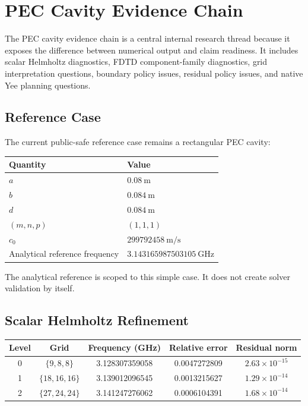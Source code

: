 \documentclass[11pt,a4paper]{article}
\begin{document}
\section{PEC Cavity Evidence Chain}
\label{sec:pec-cavity-evidence-chain}

The PEC cavity evidence chain is a central internal research thread because it exposes the difference between numerical output and claim readiness. It includes scalar Helmholtz diagnostics, FDTD component-family diagnostics, grid interpretation questions, boundary policy issues, residual policy issues, and native Yee planning questions.

\subsection{Reference Case}

The current public-safe reference case remains a rectangular PEC cavity:

\begin{center}
\begin{tabular}{ll}
\toprule
\textbf{Quantity} & \textbf{Value}\\
\midrule
\(a\) & \(0.08\ \mathrm{m}\)\\
\(b\) & \(0.084\ \mathrm{m}\)\\
\(d\) & \(0.084\ \mathrm{m}\)\\
\((m,n,p)\) & \((1,1,1)\)\\
\(c_0\) & \(299792458\ \mathrm{m/s}\)\\
Analytical reference frequency & \(3.143165987503105\ \mathrm{GHz}\)\\
\bottomrule
\end{tabular}
\end{center}

The analytical reference is scoped to this simple case. It does not create solver validation by itself.

\subsection{Scalar Helmholtz Refinement}

\begin{longtable}{ccccc}
\toprule
\textbf{Level} & \textbf{Grid} & \textbf{Frequency (GHz)} & \textbf{Relative error} & \textbf{Residual norm}\\
\midrule
\endhead
0 & \(\{9,8,8\}\) & 3.128307359058 & 0.0047272809 & \(2.63\times 10^{-15}\)\\
1 & \(\{18,16,16\}\) & 3.139012096545 & 0.0013215627 & \(1.29\times 10^{-14}\)\\
2 & \(\{27,24,24\}\) & 3.141247276062 & 0.0006104391 & \(1.68\times 10^{-14}\)\\
\bottomrule
\end{longtable}
\end{document}
